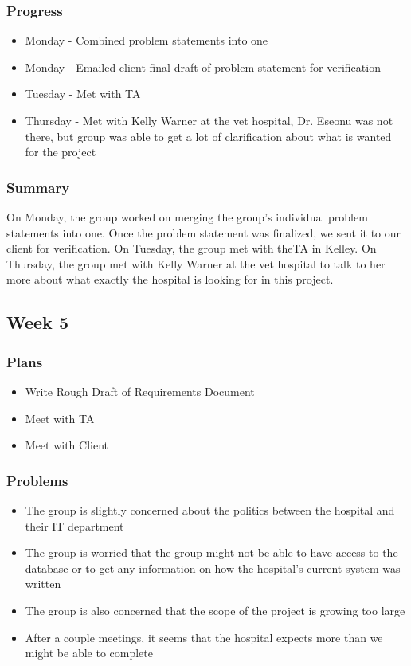 \documentclass[onecolumn, draftclsnofoot,10pt, compsoc]{IEEEtran}
\begin{document}
\subsubsection{Progress}
\begin{itemize}
\item Monday - Combined problem statements into one
\item Monday - Emailed client final draft of problem statement for verification
\item Tuesday  - Met with TA
\item Thursday - Met with Kelly Warner at the vet hospital, Dr. Eseonu was not there, but group was able to get a lot of clarification about what is wanted for the project

\end{itemize}
\subsubsection{Summary}
On Monday, the group worked on merging the group's individual problem statements into one. Once the problem statement was finalized, we sent it to our client for verification. On Tuesday, the group met with theTA in Kelley. On Thursday, the group met with Kelly Warner at the vet hospital to talk to her more about what exactly the hospital is looking for in this project.
\subsection{Week 5}

\subsubsection{Plans}
\begin{itemize}
\item Write Rough Draft of Requirements Document
\item Meet with TA
\item Meet with Client
\end{itemize}


\subsubsection{Problems}
\begin{itemize}
\item The group is slightly concerned about the politics between the hospital and their IT department 
\item The group is worried that the group might not be able to have access to the database or to get any information on how the hospital's current system was written

\item The group is also concerned that the scope of the project is growing too large
\item After a couple meetings, it seems that the hospital expects more than we might be able to complete 
\end{itemize}
\end{document}
